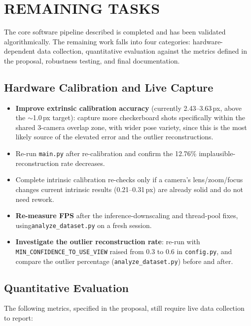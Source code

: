 \chapter{REMAINING TASKS}
 
The core software pipeline described is completed and has
been validated algorithmically. The remaining work falls into
four categories: hardware-dependent data collection, quantitative
evaluation against the metrics defined in the proposal, robustness
testing, and final documentation.
 
\section{Hardware Calibration and Live Capture}
 
\begin{itemize}
    \item \textbf{Improve extrinsic calibration accuracy} (currently
    2.43--3.63\,px, above the $\sim$1.0\,px target): capture more
    checkerboard shots specifically within the shared 3-camera overlap
    zone, with wider pose variety, since this is the most likely source
    of the elevated error and the outlier reconstructions.
    \item Re-run \texttt{main.py} after re-calibration and confirm the
    12.76\% implausible-reconstruction rate decreases.
    \item Complete intrinsic calibration re-checks only if a camera's
    lens/zoom/focus changes  current intrinsic results (0.21--0.31\,px)
    are already solid and do not need rework.
    \item \textbf{Re-measure FPS} after the inference-downscaling and
    thread-pool fixes, using\texttt{analyze\_dataset.py} on a fresh session.
    \item \textbf{Investigate the outlier reconstruction rate}: re-run
    with \texttt{MIN\_CONFIDENCE\_TO\_USE\_VIEW} raised from 0.3 to 0.6 in
    \texttt{config.py}, and compare the outlier percentage
    (\texttt{analyze\_dataset.py}) before and after.
\end{itemize}
 
\section{Quantitative Evaluation}
 
The following metrics, specified in the proposal, still require live data
collection to report:
 

